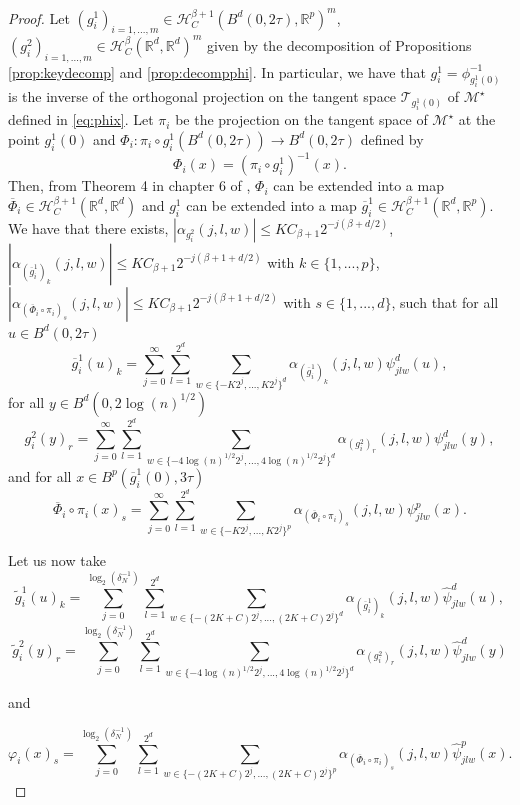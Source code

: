\documentclass[10pt]{article}
\begin{document}
\begin{proof}
    Let $(g_i^1)_{i=1,...,m}\in\mathcal{H}^{\beta+1}_{C}(B^d(0,2\tau),\mathbb{R}^p)^m$, $(g_i^2)_{i=1,...,m}\in\mathcal{H}^{\beta}_{C}(\mathbb{R}^d,\mathbb{R}^d)^m$ given by the decomposition of Propositions \ref{prop:keydecomp} and \ref{prop:decompphi}. In particular, we have that $g_i^1=\phi_{g_i^1(0)}^{-1}$ is the inverse of the orthogonal projection on the tangent space $\mathcal{T}_{g_i^1(0)}$ of $\mathcal{M}^\star$ defined in \eqref{eq:phix}. Let $\pi_i$ be the projection on the tangent space of $\mathcal{M}^\star$ at the point $g_i^1(0)$ and $\Phi_i: \pi_i \circ g_i^1(B^d(0,2\tau))\rightarrow B^d(0,2\tau)$ defined by 
    $$\Phi_i(x)=(\pi_i \circ g_i^1)^{-1}(x).$$
    Then, from Theorem 4 in chapter 6 of \cite{SingularStein}, $\Phi_i$ can be extended into a map $\overline{\Phi}_i\in \mathcal{H}^{\beta+1}_C(\mathbb{R}^d,\mathbb{R}^d)$ and $g_i^1$ can be extended into a map $\overline{g}_i^1\in \mathcal{H}^{\beta+1}_C(\mathbb{R}^d,\mathbb{R}^p)$. We have that there exists, $|\alpha_{g_i^2}(j,l,w)|\leq KC_{\beta+1} 2^{-j(\beta+d/2)}$, $|\alpha_{(\overline{g}_i^1)_k}(j,l,w)|\leq KC_{\beta+1} 2^{-j(\beta+1+d/2)}$ with $k\in \{1,...,p\}$, $|\alpha_{(\overline{\Phi}_i\circ\pi_i)_s}(j,l,w)|\leq KC_{\beta+1} 2^{-j(\beta+1+d/2)}$ with $s\in \{1,...,d\}$, such that
for all $u\in B^d(0,2\tau)$
    $$\overline{g}_i^1(u)_k=\sum \limits_{j=0}^{\infty} \sum \limits_{l=1}^{2^d} \sum \limits_{w\in \{-K2^j,...,K2^j\}^d} \alpha_{(\overline{g}_i^1)_k}(j,l,w)\psi^d_{jlw}(u),$$
for all $y\in B^d(0,2\log(n)^{1/2})$
    $$g_i^2(y)_r=\sum \limits_{j=0}^{\infty} \sum \limits_{l=1}^{2^d} \sum \limits_{w\in \{-4\log(n)^{1/2}2^j,...,4\log(n)^{1/2}2^j\}^d} \alpha_{(g_i^2)_r}(j,l,w)\psi^d_{jlw}(y),$$
and for all $x\in B^p(\overline{g}_i^1(0),3\tau)$
$$\overline{\Phi}_i\circ\pi_i(x)_s=\sum \limits_{j=0}^{\infty} \sum \limits_{l=1}^{2^d} \sum \limits_{w\in \{-K2^j,...,K2^j\}^p} \alpha_{(\overline{\Phi}_i\circ\pi_i)_s}(j,l,w)\psi^p_{jlw}(x).$$

Let us now take
    $$\tilde{g}_i^1(u)_k=\sum \limits_{j=0}^{\log_2(\delta^{-1}_N)} \sum \limits_{l=1}^{2^d} \sum \limits_{w\in \{-(2K+C)2^j,...,(2K+C)2^j\}^d} \alpha_{(\overline{g}_i^1)_k}(j,l,w)\hat{\psi}^d_{jlw}(u),$$
        $$\tilde{g}_i^2(y)_r=\sum \limits_{j=0}^{\log_2(\delta^{-1}_N)} \sum \limits_{l=1}^{2^d} \sum \limits_{w\in \{-4\log(n)^{1/2}2^j,...,4\log(n)^{1/2}2^j\}^d} \alpha_{(g_i^2)_r}(j,l,w)\hat{\psi}^d_{jlw}(y)$$

and
    
\begin{equation*}
\varphi_i(x)_s=\sum \limits_{j=0}^{\log_2(\delta^{-1}_N)} \sum \limits_{l=1}^{2^d} \sum \limits_{w\in \{-(2K+C)2^j,...,(2K+C)2^j\}^p} \alpha_{(\overline{\Phi}_i\circ\pi_i)_s}(j,l,w)\hat{\psi}^p_{jlw}(x).
\end{equation*}


\end{proof}
\end{document}
